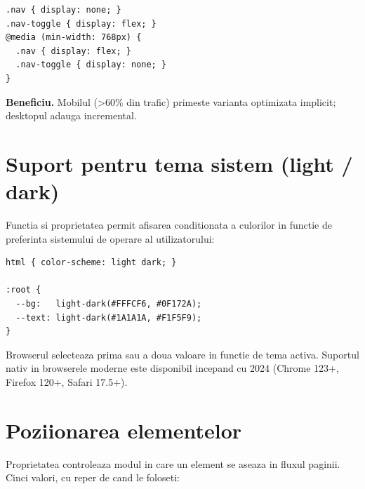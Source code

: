 \begin{dado}
\begin{lstlisting}[style=css, numbers=none]
.nav { display: none; }
.nav-toggle { display: flex; }
@media (min-width: 768px) {
  .nav { display: flex; }
  .nav-toggle { display: none; }
}
\end{lstlisting}
\textbf{Beneficiu.} Mobilul (>60\% din trafic) primeste varianta optimizata implicit; desktopul adauga incremental.
\end{dado}

\section{Suport pentru tema sistem (light / dark)}

Functia  si proprietatea  permit afisarea conditionata a culorilor in functie de preferinta sistemului de operare al utilizatorului:

\begin{lstlisting}[style=css]
html { color-scheme: light dark; }

:root {
  --bg:   light-dark(#FFFCF6, #0F172A);
  --text: light-dark(#1A1A1A, #F1F5F9);
}
\end{lstlisting}

Browserul selecteaza prima sau a doua valoare in functie de tema activa. Suportul nativ in browserele moderne este disponibil incepand cu 2024 (Chrome 123+, Firefox 120+, Safari 17.5+).

\section{Poziionarea elementelor}

Proprietatea  controleaza modul in care un element se aseaza in fluxul paginii. Cinci valori, cu reper de cand le foloseti:

